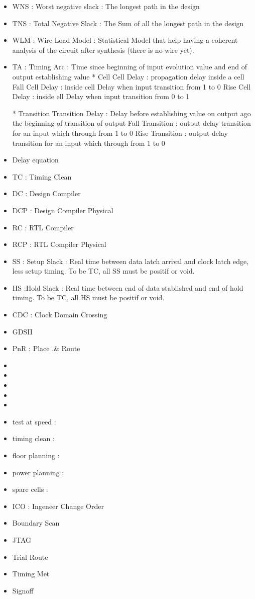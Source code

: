 \documentclass[11pt,a4paper,sans]{report}
\begin{document}
\begin{itemize}
	\item WNS : Worst negative slack : The longest path in the design
	\item TNS : Total Negative Slack : The Sum of all the longest path in the design
	\item WLM : Wire-Load Model : Statistical Model that help having a coherent
		analysis of the circuit after synthesis (there is no wire yet).


	\item TA  : Timing Arc : Time since beginning of input evolution value and end of output establishing value
		* Cell
			Cell Delay : propagation delay inside a cell
			Fall Cell Delay : inside cell Delay when input transition from 1 to 0
			Rise Cell Delay : inside ell Delay when input transition from 0 to 1

		* Transition
			Transition Delay : Delay before establishing value on output ago the beginning of transition of output
				Fall Transition : output delay transition for an input which through from 1 to 0
				Rise Transition : output delay transition for an input which through from 1 to 0				

	\item Delay equation %
	\item TC  : Timing Clean %

	\item DC : Design Compiler
	\item DCP : Design Compiler Physical
	\item RC : RTL Compiler
	\item RCP : RTL Compiler Physical
	
	\item SS : Setup Slack : Real time between data latch arrival and clock latch edge, less setup timing. To be TC, all SS must be positif or void.
	\item HS :Hold Slack : Real time between end of data stablished and end of hold timing. To be TC, all HS must be positif or void.
	\item CDC : Clock Domain Crossing
	\item GDSII
	\item PnR : Place .\& Route
	\item 
	\item 
	\item 
	\item 
	\item 
	
	\item test at speed : %
	\item timing clean :
	\item floor planning :
	\item power planning :
	\item  spare cells :
	\item  ICO : Ingeneer Change Order
	\item  Boundary Scan
	\item JTAG
	\item Trial Route
	\item  Timing Met
	\item Signoff
	

\end{itemize}
\end{document}

